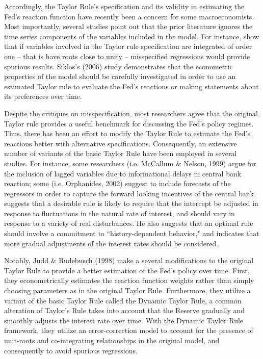 \documentclass[notitlepage,12pt]{article}
\begin{document}
Accordingly, the Taylor Rule’s specification and its validity in estimating the Fed's reaction function have recently been a concern for some macroeconomists. Most importantly, several studies point out that the prior literature ignores the time series components of the variables included in the model. For instance, \cite{siklos2006estimating} show that if variables involved in the Taylor rule specification are integrated of order one -- that is have roots close to unity -- misspecified regressions would provide spurious results. \nocite{siklos2006estimating} Siklos's (2006) study demonstrates that the econometric properties of the model should be carefully investigated in order to use an estimated Taylor rule to evaluate the Fed's reactions or making statements about its preferences over time.

Despite the critiques on misspecification, most researchers agree that the original Taylor rule provides a useful benchmark for discussing the Fed's policy regimes. Thus, there has been an effort to modify the Taylor Rule to estimate the Fed's reactions better with alternative specifications. Consequently, an extensive number of variants of the basic Taylor Rule have been employed in several studies. For instance, some researchers (i.e. McCallum \& Nelson, 1999) \nocite{mccallum1999nominal} argue for the inclusion of lagged variables due to informational delays in central bank reaction; some (i.e. Orphanides, 2002) \nocite{orphanides2002unreliability} suggest to include forecasts of the regressors in order to capture the forward looking incentives of the central bank.  \cite{woodford2001taylor} suggests that a desirable rule is likely to require that the intercept be adjusted in response to fluctuations in the natural rate of interest, and should vary in response to a variety of real disturbances. He also suggests that an optimal rule should involve a commitment to ``history-dependent behavior," and indicates that more gradual adjustments of the interest rates should be considered.

Notably, Judd \& Rudebusch (1998) make a several modifications to the original Taylor Rule to provide a better estimation of the Fed’s policy over time. First, they econometrically estimates the reaction function weights rather than simply choosing parameters as in the original Taylor Rule. Furthermore, they utilize a variant of the basic Taylor Rule called the Dynamic Taylor Rule, a common alteration of Taylor’s Rule takes into account that the Reserve gradually and smoothly adjusts the interest rate over time. With the Dynamic Taylor Rule framework, they utilize an error-correction model to account for the presence of unit-roots and co-integrating relationships in the original model, and consequently to avoid spurious regressions. 
\end{document}
